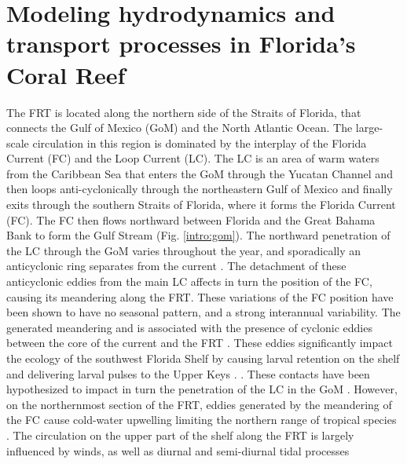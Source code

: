 \section{Modeling hydrodynamics and transport processes in Florida's Coral Reef}
The FRT is located along the northern side of the Straits of Florida, that connects the Gulf of Mexico (GoM) and the North Atlantic Ocean. The large-scale circulation in this region is dominated by the interplay of the Florida Current (FC) and the Loop Current (LC). The LC is an area of warm waters from the Caribbean Sea that enters the GoM through the Yucatan Channel and then loops anti-cyclonically through the northeastern Gulf of Mexico and finally exits through the southern Straits of Florida, where it forms the Florida Current (FC). The FC then flows northward between Florida and the Great Bahama Bank to form the Gulf Stream (Fig. \ref{intro:gom}). The northward penetration of the LC through the GoM varies throughout the year, and sporadically an anticyclonic ring separates from the current \citep{leipper1970sequence, maul1977annual, vukovich1988loop}. The detachment of these anticyclonic eddies from the main LC affects in turn the position of the FC, causing its meandering along the FRT. These variations of the FC position have been shown to have no seasonal pattern, and a strong interannual variability. The generated meandering and  is associated with the presence of  cyclonic eddies between the core of the current and the FRT \citep{kourafalou2012florida}. These eddies significantly impact the ecology of the southwest Florida Shelf by causing larval retention on the shelf and delivering larval pulses to the Upper Keys \citep{lee1994evolution,limouzy1997translocation,sponaugle2005florida, kourafalou2012florida}. . These contacts have been hypothesized to impact in turn the penetration of the LC in the GoM \citep{weisberg2017loop}. However, on the northernmost section of the FRT, eddies generated by the meandering of the FC cause cold-water upwelling limiting the northern range of tropical species \citep{walker2013determining}. The circulation on the upper part of the shelf along the FRT is largely influenced by winds, as well as diurnal and semi-diurnal tidal processes \citep{lee2001transport, lee2002volume,d2007patterns}

